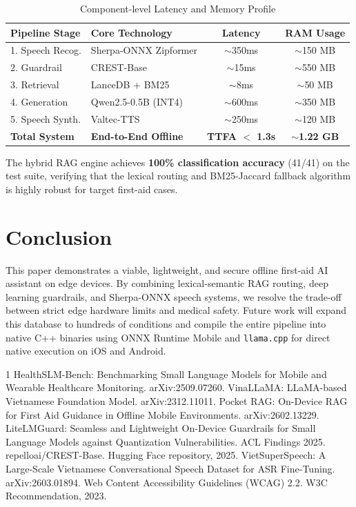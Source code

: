 \documentclass[journal,compsoc]{IEEEtran}
\begin{document}
\begin{table}[h]
\centering
\caption{Component-level Latency and Memory Profile}
\label{tab:performance}
\begin{tabular}{llcc}
\toprule
\textbf{Pipeline Stage} & \textbf{Core Technology} & \textbf{Latency} & \textbf{RAM Usage} \\
\midrule
1. Speech Recog. & Sherpa-ONNX Zipformer & $\sim$350ms & $\sim$150 MB \\
2. Guardrail & CREST-Base & $\sim$15ms & $\sim$550 MB \\
3. Retrieval & LanceDB + BM25 & $\sim$8ms & $\sim$50 MB \\
4. Generation & Qwen2.5-0.5B (INT4) & $\sim$600ms & $\sim$350 MB \\
5. Speech Synth. & Valtec-TTS & $\sim$250ms & $\sim$120 MB \\
\midrule
\textbf{Total System} & \textbf{End-to-End Offline} & \textbf{TTFA $<$ 1.3s} & \textbf{$\sim$1.22 GB} \\
\bottomrule
\end{tabular}
\end{table}

The hybrid RAG engine achieves \textbf{100\% classification accuracy} (41/41) on the test suite, verifying that the lexical routing and BM25-Jaccard fallback algorithm is highly robust for target first-aid cases.

\section{Conclusion}
This paper demonstrates a viable, lightweight, and secure offline first-aid AI assistant on edge devices. By combining lexical-semantic RAG routing, deep learning guardrails, and Sherpa-ONNX speech systems, we resolve the trade-off between strict edge hardware limits and medical safety. Future work will expand this database to hundreds of conditions and compile the entire pipeline into native C++ binaries using ONNX Runtime Mobile and \texttt{llama.cpp} for direct native execution on iOS and Android.

\begin{thebibliography}{1}
HealthSLM-Bench: Benchmarking Small Language Models for Mobile and Wearable Healthcare Monitoring. arXiv:2509.07260.
VinaLLaMA: LLaMA-based Vietnamese Foundation Model. arXiv:2312.11011.
Pocket RAG: On-Device RAG for First Aid Guidance in Offline Mobile Environments. arXiv:2602.13229.
LiteLMGuard: Seamless and Lightweight On-Device Guardrails for Small Language Models against Quantization Vulnerabilities. ACL Findings 2025.
repelloai/CREST-Base. Hugging Face repository, 2025.
VietSuperSpeech: A Large-Scale Vietnamese Conversational Speech Dataset for ASR Fine-Tuning. arXiv:2603.01894.
Web Content Accessibility Guidelines (WCAG) 2.2. W3C Recommendation, 2023.
\end{thebibliography}
\end{document}
